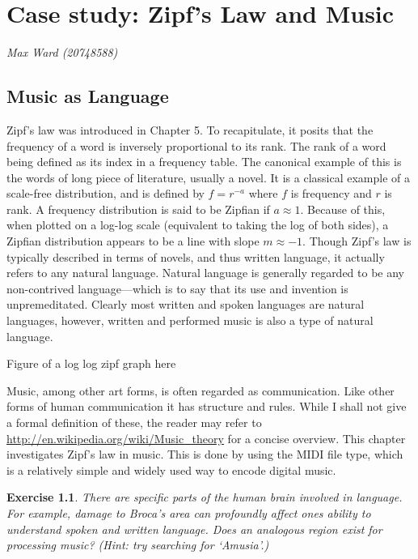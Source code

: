\documentclass[10pt]{book}
\title{\thetitle}
\author{Allen B. Downey}
\newtheorem{exercise}{Exercise}[chapter]
\begin{document}
\chapter{Case study: Zipf's Law and Music}

{\em Max Ward (20748588)}

\section{Music as Language}

Zipf's law was introduced in Chapter 5. To recapitulate, it posits that the frequency of a word is inversely proportional to its rank. The rank of a word being defined as its index in a frequency table. The canonical example of this is the words of long piece of literature, usually a novel. It is a classical example of a scale-free distribution, and is defined by $f = r^{-a}$ where $f$ is frequency and $r$ is rank. A frequency distribution is said to be Zipfian if $a \approx 1$. Because of this, when plotted on a log-log scale (equivalent to taking the log of both sides), a Zipfian distribution appears to be a line with slope $m \approx -1$. Though Zipf's law is typically described in terms of novels, and thus written language, it actually refers to any natural language. Natural language is generally regarded to be any non-contrived language---which is to say that its use and invention is unpremeditated. Clearly most written and spoken languages are natural languages, however, written and performed music is also a type of natural language.

Figure of a log log zipf graph here

Music, among other art forms, is often regarded as communication. Like other forms of human communication it has structure and rules. While I shall not give a formal definition of these, the reader may refer to \url{http://en.wikipedia.org/wiki/Music_theory} for a concise overview. This chapter investigates Zipf's law in music. This is done by using the MIDI file type, which is a relatively simple and widely used way to encode digital music.


\begin{exercise}

There are specific parts of the human brain involved in language. For example, damage to Broca's area can profoundly affect ones ability to understand spoken and written language. Does an analogous region exist for processing music? (Hint: try searching for `Amusia'.)

\end{exercise}
\end{document}
